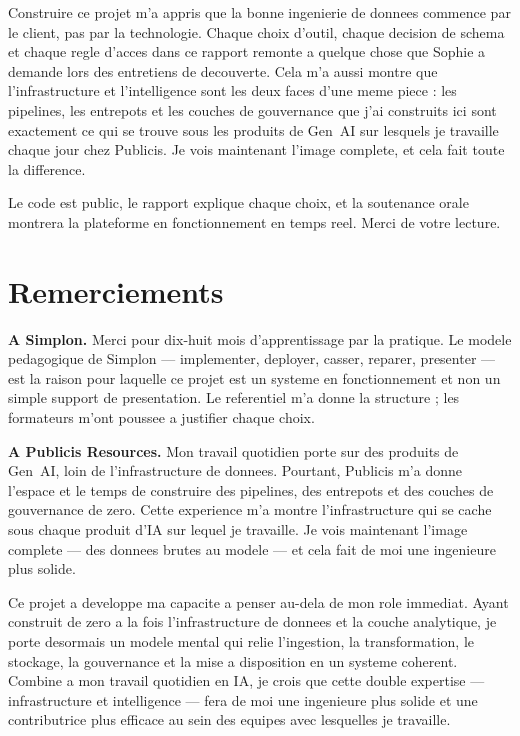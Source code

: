 \documentclass[a4paper,11pt,oneside,openany]{report}
\begin{document}
Construire ce projet m'a appris que la bonne ingenierie de donnees
commence par le client, pas par la technologie. Chaque choix d'outil,
chaque decision de schema et chaque regle d'acces dans ce rapport
remonte a quelque chose que Sophie a demande lors des entretiens de
decouverte. Cela m'a aussi montre que l'infrastructure et
l'intelligence sont les deux faces d'une meme piece : les pipelines,
les entrepots et les couches de gouvernance que j'ai construits ici
sont exactement ce qui se trouve sous les produits de Gen~AI sur
lesquels je travaille chaque jour chez Publicis. Je vois maintenant
l'image complete, et cela fait toute la difference.

Le code est public, le rapport explique chaque choix, et la soutenance
orale montrera la plateforme en fonctionnement en temps reel. Merci de
votre lecture.


\chapter*{Remerciements}

\noindent\textbf{A Simplon.} Merci pour dix-huit mois d'apprentissage
par la pratique. Le modele pedagogique de Simplon --- implementer,
deployer, casser, reparer, presenter --- est la raison pour laquelle
ce projet est un systeme en fonctionnement et non un simple support de
presentation. Le referentiel m'a donne la structure ; les formateurs
m'ont poussee a justifier chaque choix.

\vspace{0.4cm}

\noindent\textbf{A Publicis Resources.} Mon travail quotidien porte
sur des produits de Gen~AI, loin de l'infrastructure de donnees.
Pourtant, Publicis m'a donne l'espace et le temps de construire des
pipelines, des entrepots et des couches de gouvernance de zero. Cette
experience m'a montre l'infrastructure qui se cache sous chaque
produit d'IA sur lequel je travaille. Je vois maintenant l'image
complete --- des donnees brutes au modele --- et cela fait de moi une
ingenieure plus solide.

\vspace{0.4cm}

\noindent Ce projet a developpe ma capacite a penser au-dela de mon
role immediat. Ayant construit de zero a la fois l'infrastructure de
donnees et la couche analytique, je porte desormais un modele mental
qui relie l'ingestion, la transformation, le stockage, la gouvernance
et la mise a disposition en un systeme coherent. Combine a mon travail
quotidien en IA, je crois que cette double expertise --- infrastructure
et intelligence --- fera de moi une ingenieure plus solide et une
contributrice plus efficace au sein des equipes avec lesquelles je
travaille.
\end{document}
